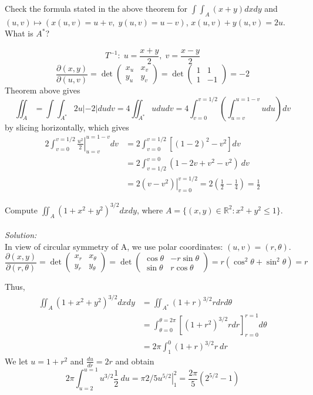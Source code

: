 \documentclass[12pt]{book}
\theoremstyle{definition}
\theoremstyle{remark}
\newcommand\sol{%
  \\ 
  \\
  \textit{Solution:}\\%
}
\begin{document}
  \begin{example}Check the formula stated in the above theorem for $\int\int_A (x + y ) dx dy $ and $(u,v) \mapsto (x(u,v) = u+v, \; y(u,v) = u-v)$, $x(u,v)+ y(u,v) = 2u$. What is $A^*$? 
    
    $$T^{-1} : \; u = \frac{x+ y }{2}, \; v = \frac{x-y}{2}$$
    $$\frac{\partial {(x,y)}}{\partial {(u,v)}} = \det \begin{pmatrix}
      x_u & x_v \\ y_u & y_v
    \end{pmatrix} = \det \begin{pmatrix}
      1&1 \\ 1&-1
    \end{pmatrix} = -2  $$
  Theorem above gives 
    $$\iint_A = \int \int_{A^*} 2 u | -2| du dv = 4 \iint_{A^*} ududv = 4 \int^{v= 1/2}_{v = 0} \left(  \int^{u = 1-v}_{u = v} u du\right) dv   $$
    by slicing horizontally, which gives 
    \begin{equation*}
      \begin{split}
        2 \int^{v = 1/2}_{v =0} \left.\frac{u^2}{2} \right|_{u=v}^{u = 1 -v} dv &= 2 \int_{v=0}^{v = 1/2}[(1-2)^2 -v^2] dv \\ 
          &= 2 \int_{{v=1/2}}^{{v=0}} {(1-2v+ v^2 -v^2)} \: d{v} \\ 
          &=\left. 2(v-v^2)\right|^{v=1/2}_{v=0} = 2 \left( \frac{1}{2} -\frac{1}{4}  \right) = \frac{1}{2} 
      \end{split}
    \end{equation*}
  \end{example}
  \begin{example}Compute $\iint_A (1+ x^2 + y^2 )^{3/2} dx dy$, where $A = \{ (x,y)  \in \mathbb{R}^2 : x^2 + y^2 \leq 1 \}$. 
    \sol
    In view of circular symmetry of A, we use polar coordinates: $(u,v) = (r, \theta)$. 
    $$\frac{\partial {(x,y)}}{\partial {(r,\theta)}}  = \det \begin{pmatrix}
      x_r & x_\theta \\ y_r & y_\theta
    \end{pmatrix} = \det \begin{pmatrix}
    \cos \theta & - r \sin \theta \\ \sin \theta & r \cos \theta
    \end{pmatrix}  = r (\cos^2 \theta + \sin^2 \theta) = r $$

Thus, 
\begin{equation*}
  \begin{split}
   \iint_{A} ( 1 + x^2 + y^2 )^{3/2} dx dy &= \iint_{A^*} (1 + r)^{3/2} r dr d\theta \\ 
    &=  \int_{{\theta = 0 }}^{{\theta = 2 \pi }} \left[ (1 + r^2)^{3/2}r dr \right]^{ r=1 }_{r = 0} d\theta {} \\ 
    &= 2 \pi \int_{{1}}^{{0}} {(1+ r)^{3/2} r} \: d{r} 
  \end{split}
\end{equation*}
    We let $ u = 1 + r^2 $ and $\frac{du}{dr} = 2r$ and obtain
    $$2 \pi \int_{{u=2}}^{{u= 1}} {u^{3/2} \frac{1}{2} } \: d{u} = \left.\pi 2/5 u^{5/2} \right|^2_1= \frac{2\pi }{5} ( 2^{5/2}- 1 ) $$ 
  \end{example}
\end{document}

